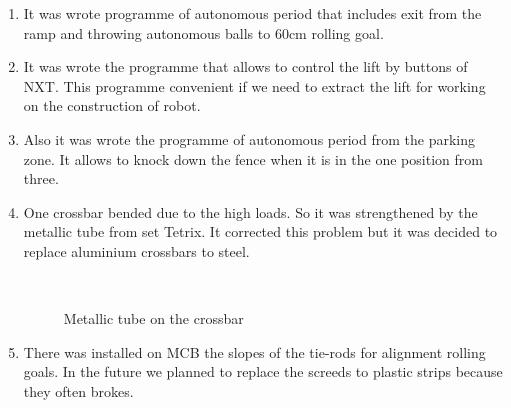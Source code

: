 \begin{enumerate}
	\item It was wrote programme of autonomous period that includes exit from the ramp and throwing autonomous balls to 60cm rolling goal.
	
	\item It was wrote the programme that allows to control the lift by buttons of NXT. This programme convenient if we need to extract the lift for working on the construction of robot.
	
	\item Also it was wrote the programme of autonomous period from the parking zone. It allows to knock down the fence when it is in the one position from three.
	
	\item One crossbar bended due to the high loads. So it was strengthened by the metallic tube from set Tetrix. It corrected this problem but it was decided to replace aluminium crossbars to steel.
	
	\begin{figure}[H]
		\begin{minipage}[h]{0.2\linewidth}
			\center  
		\end{minipage}
		\begin{minipage}[h]{0.6\linewidth}
			\caption{Metallic tube on the crossbar}
		\end{minipage}
	\end{figure}
	
	\item There was installed on MCB the slopes of the tie-rods for alignment rolling goals. In the future we planned to replace the screeds  to plastic strips because they often brokes.
	

\end{enumerate}
